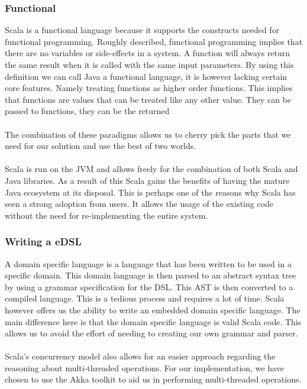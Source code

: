 \subsubsection{Functional}
Scala is a functional language because it supports the constructs needed for functional programming. Roughly described, functional programming implies that there are no variables or side-effects in a system. A function will always return the same result when it is called with the same input parameters. By using this definition we can call Java a functional language, it is however lacking certain core features. Namely treating functions as higher order functions. This implies that functions are values that can be  treated like any other value. They can be passed to functions, they can be the returned 
\\\\
The combination of these paradigms allows us to cherry pick the parts that we need for our solution and use the best of two worlds.
\\\\
Scala is run on the JVM and allows freely for the combination of both Scala and Java libraries. As a result of this Scala gains the benefits of having the mature Java ecosystem at its disposal. This is perhaps one of the reasons why Scala has seen a strong adoption from users. It allows the usage of the existing code without the need for re-implementing the entire system.

\subsubsection{Writing a eDSL}
A domain specific language is a language that has been written to be used in a specific domain. This domain language is then parsed to an abstract syntax tree by using a grammar specification for the DSL. This AST is then converted to a compiled language. This is a tedious process and requires a lot of time. Scala however offers us the ability to write an embedded domain specific language. The main difference here is that the domain specific language is valid Scala code. This allows us to avoid the effort of needing to creating our own grammar and parser. 
\\\\
Scala’s concurrency model also allows for an easier approach regarding the reasoning about multi-threaded operations. For our implementation, we have chosen to use the Akka toolkit to aid us in performing multi-threaded operations.
\\\\
